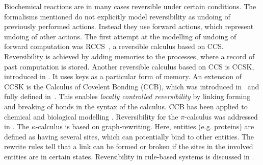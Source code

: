 Biochemical reactions are in many cases reversible under certain conditions. The formalisms mentioned do not explicitly model reversibility as undoing of previously performed actions. Instead they use forward actions, which represent undoing of other actions.
The first attempt at the modelling of undoing of forward computation was RCCS~\cite{10.1007/978-3-540-28644-8_19}, a reversible calculus based on CCS. Reversibility is achieved by adding memories to the processes, where a record of past computation is stored. Another reversible calculus based on CCS is CCSK, introduced in \cite{PHILLIPS200770}. It uses keys as a particular form of memory. An extension of CCSK is the Calculus of Covelent Bonding (CCB), which was introduced in~\cite{KU16} and fully defined in~\cite{KU2017}. This enables \textit{locally controlled reversibility} by linking forming and breaking of bonds in the syntax of the calculus. CCB has been applied to chemical and biological modelling \cite{10.1007/978-3-319-99498-7_8, Kuhn2020ReversibilityIC}. Reversibility for the $\pi$-calculus was addressed in \cite{10.1007/978-3-642-15375-4_33}. The $\kappa$-calculus \cite{DANOS200469} is based on graph-rewriting. Here, entities (e.g. proteins) are defined as having several sites, which can potentially bind to other entities. The rewrite rules tell that a link can be formed or broken if the sites in the involved entities are in certain states. Reversibility in rule-based systems is discussed in \cite{Aman2020}.
